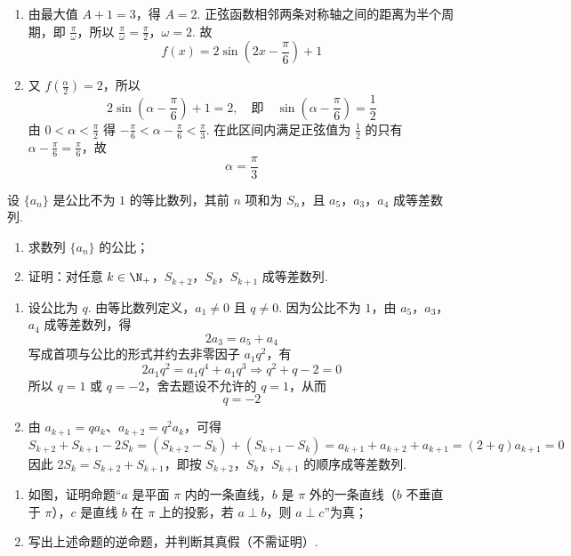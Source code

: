 \begin{solution}
\begin{enumerate}
\item 由最大值 \(A+1=3\)，得 \(A=2\). 正弦函数相邻两条对称轴之间的距离为半个周期，即 \(\frac{\pi}{\omega}\)，所以
\(\frac\pi\omega=\frac\pi2\)，\(\omega=2\).
故
\[
f(x)=2\sin\left(2x-\frac\pi6\right)+1
\]

\item 又 \(f(\frac{\alpha}{2})=2\)，所以
\[
2\sin\left(\alpha-\frac\pi6\right)+1=2,
\quad\text{即}\quad
\sin\left(\alpha-\frac\pi6\right)=\frac12
\]
由 \(0<\alpha<\frac{\pi}{2}\) 得 \(-\frac{\pi}{6}<\alpha-\frac{\pi}{6}<\frac{\pi}{3}\). 在此区间内满足正弦值为 \(\frac{1}{2}\) 的只有 \(\alpha-\frac{\pi}{6}=\frac{\pi}{6}\)，故
\[
\alpha=\frac\pi3
\]
\end{enumerate}
\end{solution}

\begin{problem}
设 \(\{a_{n}\}\) 是公比不为 \(1\) 的等比数列，其前 \(n\) 项和为 \(S_{n}\)，且 \(a_{5}\)，\(a_{3}\)，\(a_{4}\) 成等差数列.

\begin{enumerate}
\item 求数列 \(\{a_{n}\}\) 的公比；
\item 证明：对任意 \(k \in \N_+\)，\(S_{k+2}\)，\(S_{k}\)，\(S_{k+1}\) 成等差数列.
\end{enumerate}
\end{problem}

\begin{solution}
\begin{enumerate}
\item 设公比为 \(q\). 由等比数列定义，\(a_1\ne0\) 且 \(q\ne0\). 因为公比不为 \(1\)，由 \(a_5\)，\(a_3\)，\(a_4\) 成等差数列，得
\[
2a_3=a_5+a_4
\]
写成首项与公比的形式并约去非零因子 \(a_1q^2\)，有
\[
2a_1q^2=a_1q^4+a_1q^3
\Longrightarrow q^2+q-2=0
\]
所以 \(q=1\) 或 \(q=-2\)，舍去题设不允许的 \(q=1\)，从而
\[
q=-2
\]

\item 由 \(a_{k+1}=qa_k\)、\(a_{k+2}=q^2a_k\)，可得
\[
S_{k+2}+S_{k+1}-2S_k
=(S_{k+2}-S_k)+(S_{k+1}-S_k)
=a_{k+1}+a_{k+2}+a_{k+1}
=(2+q)a_{k+1}=0
\]
因此 \(2S_k=S_{k+2}+S_{k+1}\)，即按 \(S_{k+2}\)，\(S_k\)，\(S_{k+1}\) 的顺序成等差数列.
\end{enumerate}
\end{solution}

\begin{problem}
\begin{enumerate}
\item 如图，证明命题“\(a\) 是平面 \(\pi\) 内的一条直线，\(b\) 是 \(\pi\) 外的一条直线（\(b\) 不垂直于 \(\pi\)），\(c\) 是直线 \(b\) 在 \(\pi\) 上的投影，若 \(a \perp b\)，则 \(a \perp c\)”为真；
\item 写出上述命题的逆命题，并判断其真假（不需证明）.
\end{enumerate}

\end{problem}

